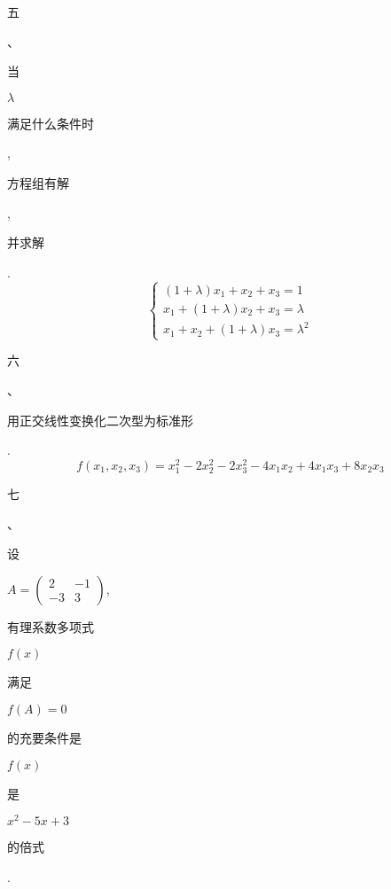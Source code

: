 \documentclass[10pt]{article}
\begin{document}
\begin{CJK}{UTF8}{mj}五\end{CJK}、\begin{CJK}{UTF8}{mj}当\end{CJK} $\lambda$ \begin{CJK}{UTF8}{mj}满足什么条件时\end{CJK}, \begin{CJK}{UTF8}{mj}方程组有解\end{CJK}, \begin{CJK}{UTF8}{mj}并求解\end{CJK}.
$$
\left\{\begin{array}{l}
(1+\lambda) x_{1}+x_{2}+x_{3}=1 \\
x_{1}+(1+\lambda) x_{2}+x_{3}=\lambda \\
x_{1}+x_{2}+(1+\lambda) x_{3}=\lambda^{2}
\end{array}\right.
$$
\begin{CJK}{UTF8}{mj}六\end{CJK}、\begin{CJK}{UTF8}{mj}用正交线性变换化二次型为标准形\end{CJK}.
$$
f\left(x_{1}, x_{2}, x_{3}\right)=x_{1}^{2}-2 x_{2}^{2}-2 x_{3}^{2}-4 x_{1} x_{2}+4 x_{1} x_{3}+8 x_{2} x_{3}
$$
\begin{CJK}{UTF8}{mj}七\end{CJK}、\begin{CJK}{UTF8}{mj}设\end{CJK} $A=\left(\begin{array}{cc}2 & -1 \\ -3 & 3\end{array}\right)$, \begin{CJK}{UTF8}{mj}有理系数多项式\end{CJK} $f(x)$ \begin{CJK}{UTF8}{mj}满足\end{CJK} $f(A)=0$ \begin{CJK}{UTF8}{mj}的充要条件是\end{CJK} $f(x)$ \begin{CJK}{UTF8}{mj}是\end{CJK} $x^{2}-5 x+3$ \begin{CJK}{UTF8}{mj}的倍式\end{CJK}.
\end{document}
